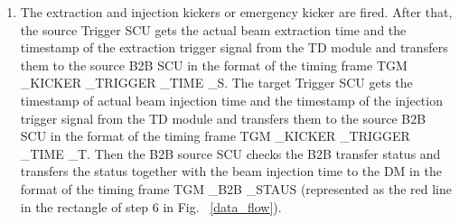 \begin{enumerate}
\item  The extraction and injection kickers or emergency kicker are fired. After that, the source Trigger SCU gets the actual beam extraction time and the timestamp of the extraction trigger signal from the TD module and transfers them to the source B2B SCU in the format of the timing frame TGM \_KICKER \_TRIGGER \_TIME \_S. The target Trigger SCU gets the timestamp of actual beam injection time and the timestamp of the injection trigger signal from the TD module and transfers them to the source B2B SCU in the format of the timing frame TGM \_KICKER \_TRIGGER \_TIME \_T. Then the B2B source SCU checks the B2B transfer status and transfers the status together with the beam injection time to the DM in the format of the timing frame TGM \_B2B \_STAUS (represented as the red line in the rectangle of step 6 in Fig. ~\ref{data_flow}).

\end{enumerate}


